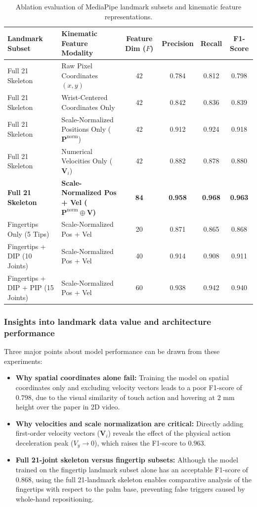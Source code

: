 \begin{table}[htbp]
\centering
\caption{Ablation evaluation of MediaPipe landmark subsets and kinematic feature representations.}
\label{tab:landmark_feature_ablation}
\begin{tabular}{l l c c c c}
\toprule
\textbf{Landmark Subset} & \textbf{Kinematic Feature Modality} & \textbf{Feature Dim ($F$)} & \textbf{Precision} & \textbf{Recall} & \textbf{F1-Score} \\
\midrule
Full 21 Skeleton & Raw Pixel Coordinates $(x, y)$ & 42 & 0.784 & 0.812 & 0.798 \\
Full 21 Skeleton & Wrist-Centered Coordinates Only & 42 & 0.842 & 0.836 & 0.839 \\
Full 21 Skeleton & Scale-Normalized Positions Only ($\mathbf{P}^{\text{norm}}$) & 42 & 0.912 & 0.924 & 0.918 \\
Full 21 Skeleton & Numerical Velocities Only ($\mathbf{V}_i$) & 42 & 0.882 & 0.878 & 0.880 \\
\textbf{Full 21 Skeleton} & \textbf{Scale-Normalized Pos + Vel ($\mathbf{P}^{\text{norm}} \oplus \mathbf{V}$)} & \textbf{84} & \textbf{0.958} & \textbf{0.968} & \textbf{0.963} \\
\midrule
Fingertips Only (5 Tips) & Scale-Normalized Pos + Vel & 20 & 0.871 & 0.865 & 0.868 \\
Fingertips + DIP (10 Joints) & Scale-Normalized Pos + Vel & 40 & 0.914 & 0.908 & 0.911 \\
Fingertips + DIP + PIP (15 Joints) & Scale-Normalized Pos + Vel & 60 & 0.938 & 0.942 & 0.940 \\
\bottomrule
\end{tabular}%
\end{table}

\subsubsection{Insights into landmark data value and architecture performance}
Three major points about model performance can be drawn from these experiments:
\begin{itemize}
    \item \textbf{Why spatial coordinates alone fail:} Training the model on spatial coordinates only and excluding velocity vectors leads to a poor F1-score of $0.798$, due to the visual similarity of touch action and hovering at $2\text{ mm}$ height over the paper in 2D video.
    \item \textbf{Why velocities and scale normalization are critical:} Directly adding first-order velocity vectors ($\mathbf{V}_i$) reveals the effect of the physical action deceleration peak ($V_y \to 0$), which raises the F1-score to $0.963$.
    \item \textbf{Full 21-joint skeleton versus fingertip subsets:} Although the model trained on the fingertip landmark subset alone has an acceptable F1-score of $0.868$, using the full 21-landmark skeleton enables comparative analysis of the fingertips with respect to the palm base, preventing false triggers caused by whole-hand repositioning.
\end{itemize}


